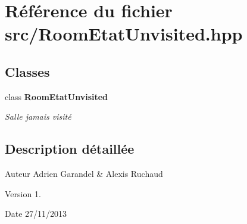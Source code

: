 \section{Référence du fichier src/\-Room\-Etat\-Unvisited.hpp}
\label{_room_etat_unvisited_8hpp}
\subsection*{Classes}
\begin{DoxyCompactItemize}
\item 
class {\bf Room\-Etat\-Unvisited}
\begin{DoxyCompactList}\small\item\em Salle jamais visité \end{DoxyCompactList}\end{DoxyCompactItemize}


\subsection{Description détaillée}
\begin{DoxyAuthor}{Auteur}
Adrien Garandel \& Alexis Ruchaud 
\end{DoxyAuthor}
\begin{DoxyVersion}{Version}
1. 
\end{DoxyVersion}
\begin{DoxyDate}{Date}
27/11/2013 
\end{DoxyDate}
